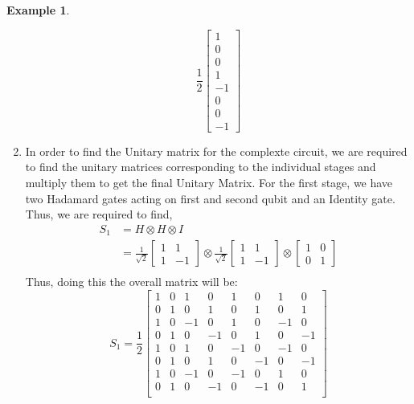 \documentclass[12pt, oneside]{book}
\theoremstyle{definition}
\theoremstyle{definition}
\newtheorem{example}{Example}[section]
\theoremstyle{remark}
\begin{document}
\begin{example}
\begin{enumerate}
        \[
            \frac{1}{2}\begin{bmatrix} 1 \\ 0 \\ 0 \\ 1 \\ -1 \\ 0 \\ 0 \\-1 \end{bmatrix}
        \]
        \item In order to find the Unitary matrix for the complexte circuit, we are required to find the unitary matrices corresponding to 
        the individual stages and multiply them to get the final Unitary Matrix.
        For the first stage, we have two Hadamard gates acting on first and second qubit and an Identity gate. Thus, we are required to find,
        \begin{align*}
            S_1 &= H \otimes H \otimes I\\
            &= \frac{1}{\sqrt{2}}\begin{bmatrix} 1 & 1 \\ 1 & -1 \end{bmatrix} \otimes \frac{1}{\sqrt{2}}\begin{bmatrix} 1 & 1 \\ 1 & -1 \end{bmatrix} \otimes \begin{bmatrix} 1 & 0 \\ 0 & 1 \end{bmatrix}\\
        \end{align*}
        Thus, doing this the overall matrix will be:
        \[
            S_1 = \frac{1}{2}\begin{bmatrix}
                1 & 0 & 1 & 0 & 1 & 0 & 1 & 0 \\
                0 & 1 & 0 & 1 & 0 & 1 & 0 & 1 \\
                1 & 0 & -1 & 0 & 1 & 0 & -1 & 0 \\
                0 & 1 & 0 & -1 & 0 & 1 & 0 & -1 \\
                1 & 0 & 1 & 0 & -1 & 0 & -1 & 0 \\
                0 & 1 & 0 & 1 & 0 & -1 & 0 & -1 \\
                1 & 0 & -1 & 0 & -1 & 0 & 1 & 0 \\
                0 & 1 & 0 & -1 & 0 & -1 & 0 & 1 \\
            \end{bmatrix}
\]
\end{enumerate}
\end{example}
\end{document}
